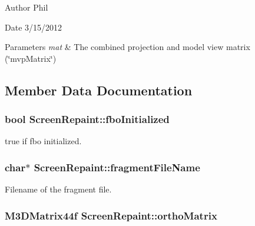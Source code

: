\begin{DoxyAuthor}{Author}
Phil 
\end{DoxyAuthor}
\begin{DoxyDate}{Date}
3/15/2012
\end{DoxyDate}

\begin{DoxyParams}{Parameters}
{\em mat} & The combined projection and model view matrix (\char`\"{}mvp\-Matrix\char`\"{}) \\
\hline
\end{DoxyParams}


\subsection{Member Data Documentation}
\hypertarget{class_screen_repaint_aa611aa789845c1503ac2fca30a992168}{
\subsubsection[{fbo\-Initialized}]{\setlength{\rightskip}{0pt plus 5cm}bool {\bf Screen\-Repaint\-::fbo\-Initialized}}}\label{class_screen_repaint_aa611aa789845c1503ac2fca30a992168}
true if fbo initialized. \hypertarget{class_screen_repaint_ac78e420a0c861ad17c63f5e0ac5473dc}{
\subsubsection[{fragment\-File\-Name}]{\setlength{\rightskip}{0pt plus 5cm}char$\ast$ {\bf Screen\-Repaint\-::fragment\-File\-Name}}}\label{class_screen_repaint_ac78e420a0c861ad17c63f5e0ac5473dc}
Filename of the fragment file. \hypertarget{class_screen_repaint_acb9d4f9bbb2328a04e59833932b484f5}{
\subsubsection[{ortho\-Matrix}]{\setlength{\rightskip}{0pt plus 5cm}M3\-D\-Matrix44f {\bf Screen\-Repaint\-::ortho\-Matrix}}}\label{class_screen_repaint_acb9d4f9bbb2328a04e59833932b484f5}
